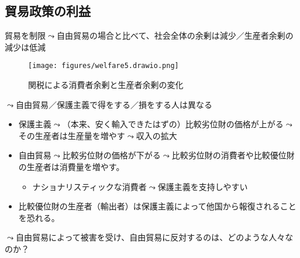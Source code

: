 \documentclass[
  xelatex,
  ja=standard]{bxjsarticle}
\providecommand{\tightlist}{%
  \setlength{\itemsep}{0pt}\setlength{\parskip}{0pt}}\usepackage{longtable,booktabs,array}
\begin{document}
\hypertarget{ux8cbfux6613ux653fux7b56ux306eux5229ux76ca}{%
\subsection{貿易政策の利益}\label{ux8cbfux6613ux653fux7b56ux306eux5229ux76ca}}

貿易を制限\(\leadsto\)自由貿易の場合と比べて、社会全体の余剰は減少／生産者余剰の減少は低減

\begin{figure}[htpb]

{\centering \texttt{[image: figures/welfare5.drawio.png]}

}

\caption{関税による消費者余剰と生産者余剰の変化}

\end{figure}

\(\leadsto\)自由貿易／保護主義で得をする／損をする人は異なる

\begin{itemize}
\tightlist
\item
  保護主義\(\leadsto\)（本来、安く輸入できたはずの）比較劣位財の価格が上がる\(\leadsto\)その生産者は生産量を増やす\(\leadsto\)収入の拡大
\item
  自由貿易\(\leadsto\)比較劣位財の価格が下がる\(\leadsto\)比較劣位財の消費者\citep{baker2005}や比較優位財の生産者は消費量を増やす。

  \begin{itemize}
  \tightlist
  \item
    ナショナリスティックな消費者\(\leadsto\)保護主義を支持しやすい\citep{mansfield2013}
  \end{itemize}
\item
  比較優位財の生産者（輸出者）は保護主義によって他国から報復されることを恐れる。
\end{itemize}

\(\leadsto\)自由貿易によって被害を受け、自由貿易に反対するのは、どのような人々なのか？
\end{document}

